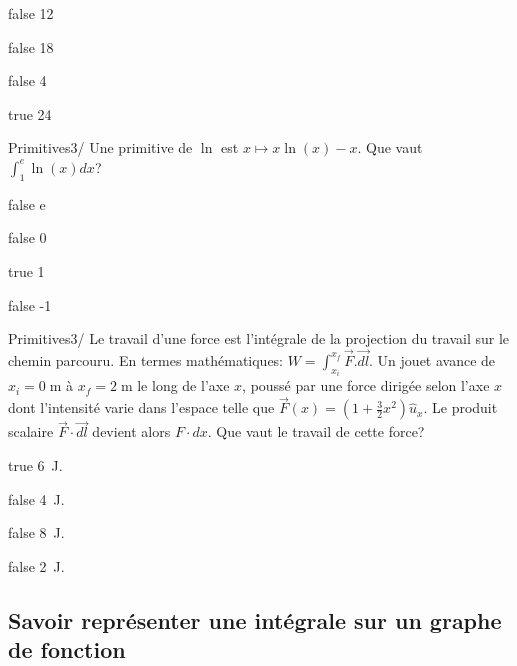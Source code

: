 \documentclass[11pt]{article}
\begin{document}
            \begin{reponses}
                \item[false] 12
                \item[false] 18
                \item[false] 4
                \item[true] 24
            \end{reponses}
        
        	\begin{question}{60}{Primitives}{3}{/}
				Une primitive de $\ln$ est $x\mapsto x\ln(x)-x$. Que vaut $\int_{1}^e \ln(x)dx$?
            \end{question}

            \begin{reponses}
            	\item[false] e
            	\item[false] 0
                \item[true] 1
                \item[false] -1
            \end{reponses}

            \begin{question}{60}{Primitives}{3}{/}
                Le travail d'une force est l'intégrale de la projection du travail sur le chemin parcouru. En termes mathématiques: $W=\int_{x_i}^{x_f}\vec{F}.\vec{dl}$. Un jouet avance de $x_i=0\;\si{\meter}$ à $x_f=2\;\si{\meter}$ le long de l'axe $x$, poussé par une force dirigée selon l'axe $x$ dont l'intensité varie dans l'espace telle que $\vec{F}(x) = (1+\frac{3}{2}x^2)\hat{u}_x$. Le produit scalaire $\vec{F}\cdot\vec{dl}$ devient alors $F\cdot dx$.
                Que vaut le travail de cette force?
            \end{question}

            \begin{reponses}
                \item[true] \SI{6}{J}.
                \item[false] \SI{4}{J}.
                \item[false] \SI{8}{J}.
                \item[false] \SI{2}{J}.
            \end{reponses}

        \subsection{Savoir représenter une intégrale sur un graphe de fonction}
        
\end{document}
